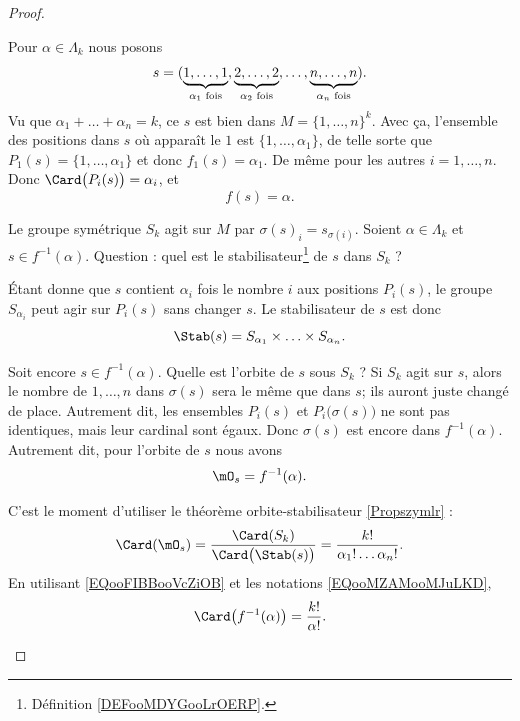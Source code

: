 \begin{proof}
\begin{subproof}
		Pour \(\alpha\in\Lambda_k\) nous posons
		\begin{equation}
			s=(\underbrace{1,\ldots,1}_{\text{\( \alpha_1\) fois}}, \underbrace{2,\ldots,2}_{\text{\( \alpha_2\) fois}},\ldots,\underbrace{n,\ldots,n}_{\text{\( \alpha_n\) fois}}).
		\end{equation}
		Vu que \( \alpha_1+\ldots+\alpha_n=k\), ce \( s\) est bien dans \( M=\{ 1,\ldots,n \}^k\). Avec ça, l'ensemble des positions dans \( s\) où apparaît le \( 1\) est \( \{ 1,\ldots,\alpha_1 \}\), de telle sorte que \( P_1(s)=\{ 1,\ldots,\alpha_1 \}\) et donc \( f_1(s)=\alpha_1\). De même pour les autres \( i=1,\ldots,n\). Donc \( \Card\big( P_i(s) \big)=\alpha_i\), et
		\begin{equation}
			f(s)=\alpha.
		\end{equation}

		\spitem[Stabilisateur]
		Le groupe symétrique \( S_k\) agit sur \( M\) par \( \sigma(s)_i=s_{\sigma(i)}\). Soient \( \alpha\in \Lambda_k\) et \( s\in f^{-1}(\alpha)\). Question : quel est le stabilisateur\footnote{Définition \ref{DEFooMDYGooLrOERP}.} de \( s\) dans \( S_k\) ?

		Étant donne que \( s\) contient \( \alpha_i\) fois le nombre \( i\) aux positions \( P_i(s)\), le groupe \( S_{\alpha_i}\) peut agir sur \( P_i(s)\) sans changer \( s\). Le stabilisateur de \( s\) est donc
		\begin{equation}
			\Stab(s)= S_{\alpha_1}\times\ldots\times S_{\alpha_n}.
		\end{equation}

		\spitem[Orbite]
		Soit encore \( s\in f^{-1}(\alpha)\). Quelle est l'orbite de \( s\) sous \( S_k\) ? Si \( S_k\) agit sur \( s\), alors le nombre de \( 1,\ldots,n\) dans \( \sigma(s)\) sera le même que dans \( s\); ils auront juste changé de place. Autrement dit, les ensembles \( P_i(s)\) et \( P_i\big( \sigma(s) \big)\) ne sont pas identiques, mais leur cardinal sont égaux. Donc \( \sigma(s)\) est encore dans \( f^{-1}(\alpha)\). Autrement dit, pour l'orbite de \( s\) nous avons
		\begin{equation}		\label{EQooFIBBooVcZiOB}
			\mO_s=f^{-1}(\alpha).
		\end{equation}

		C'est le moment d'utiliser le théorème orbite-stabilisateur \ref{Propszymlr} :
		\begin{equation}
			\Card(\mO_s)=\frac{ \Card(S_k) }{ \Card\big( \Stab(s) \big)}=\frac{ k! }{ \alpha_1!\ldots \alpha_n! }.
		\end{equation}
		En utilisant \eqref{EQooFIBBooVcZiOB} et les notations \ref{EQooMZAMooMJuLKD},
		\begin{equation}		\label{EQooFQONooJhLOER}
			\Card\big( f^{-1}(\alpha) \big)=\frac{ k! }{ \alpha! }.
		\end{equation}


\end{subproof}
\end{proof}
